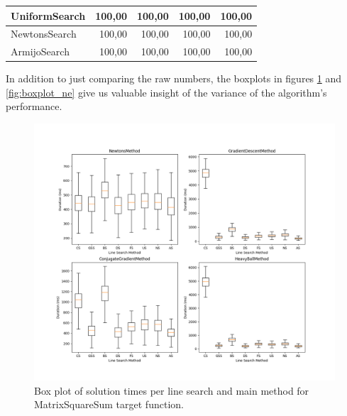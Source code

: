 \documentclass[a4paper,english,titlepage,12pt]{article}
\begin{document}
\begin{table}[H]
\begin{tabular}{|l|r|r|r|r|}
    UniformSearch                                                             & 100,00                                                   & 100,00                                                    & 100,00                                                    & 100,00                                                    \\ \hline
    NewtonsSearch                                                             & 100,00                                                   & 100,00                                                    & 100,00                                                    & 100,00                                                    \\ \hline
    ArmijoSearch                                                              & 100,00                                                   & 100,00                                                    & 100,00                                                    & 100,00                                                    \\ \hline
    \end{tabular}
\end{table}

In addition to just comparing the raw numbers, the boxplots in figures \ref{fig:boxplot_mss} and \ref{fig:boxplot_ne} give us valuable insight of the variance of the algorithm's performance.

\begin{figure}[H]
	\centering
	\includegraphics[width=1.0\textwidth]{images/boxplot_mss.png}
	\caption{Box plot of solution times per line search and main method for MatrixSquareSum target function.}
	\label{fig:boxplot_mss}
\end{figure}
\end{document}

